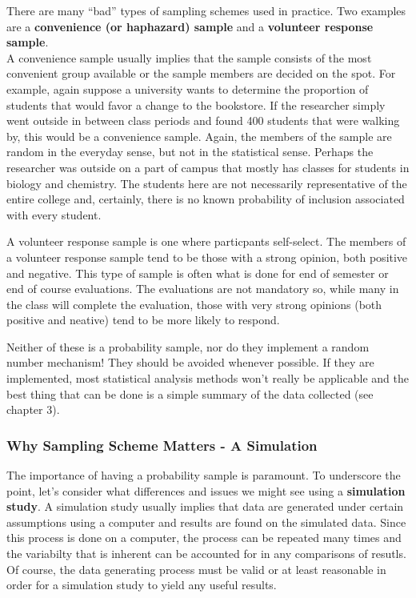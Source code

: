 \documentclass[
]{book}
\theoremstyle{definition}
\theoremstyle{definition}
\theoremstyle{definition}
\theoremstyle{remark}
\begin{document}
There are many ``bad'' types of sampling schemes used in practice. Two examples are a \textbf{convenience (or haphazard) sample} and a \textbf{volunteer response sample}.\\
A convenience sample usually implies that the sample consists of the most convenient group available or the sample members are decided on the spot. For example, again suppose a university wants to determine the proportion of students that would favor a change to the bookstore. If the researcher simply went outside in between class periods and found 400 students that were walking by, this would be a convenience sample. Again, the members of the sample are random in the everyday sense, but not in the statistical sense. Perhaps the researcher was outside on a part of campus that mostly has classes for students in biology and chemistry. The students here are not necessarily representative of the entire college and, certainly, there is no known probability of inclusion associated with every student.

A volunteer response sample is one where particpants self-select. The members of a volunteer response sample tend to be those with a strong opinion, both positive and negative. This type of sample is often what is done for end of semester or end of course evaluations. The evaluations are not mandatory so, while many in the class will complete the evaluation, those with very strong opinions (both positive and neative) tend to be more likely to respond.

Neither of these is a probability sample, nor do they implement a random number mechanism! They should be avoided whenever possible. If they are implemented, most statistical analysis methods won't really be applicable and the best thing that can be done is a simple summary of the data collected (see chapter 3).

\hypertarget{why-sampling-scheme-matters---a-simulation}{%
\subsubsection{Why Sampling Scheme Matters - A Simulation}\label{why-sampling-scheme-matters---a-simulation}}

The importance of having a probability sample is paramount. To underscore the point, let's consider what differences and issues we might see using a \textbf{simulation study}. A simulation study usually implies that data are generated under certain assumptions using a computer and results are found on the simulated data. Since this process is done on a computer, the process can be repeated many times and the variabilty that is inherent can be accounted for in any comparisons of resutls. Of course, the data generating process must be valid or at least reasonable in order for a simulation study to yield any useful results.
\end{document}
